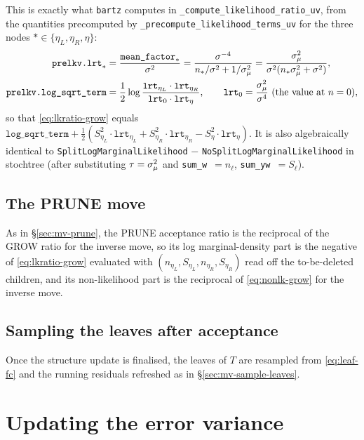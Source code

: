 This is exactly what \texttt{bartz} computes in
\texttt{\_compute\_likelihood\_ratio\_uv}, from the quantities precomputed by
\texttt{\_precompute\_likelihood\_terms\_uv} for the three nodes
$* \in \{\eta_L, \eta_R, \eta\}$:
\begin{align*}
	\texttt{prelkv.lrt}_*       & = \frac{\texttt{mean\_factor}_*}{\sigma^{2}}
	= \frac{\sigma^{-4}}{n_*/\sigma^{2} + 1/\sigma_\mu^{2}}
	= \frac{\sigma_\mu^{2}}{\sigma^{2} (n_* \sigma_\mu^{2} + \sigma^{2})},                                    \\
	\texttt{prelkv.log\_sqrt\_term} & = \frac{1}{2} \log\frac{\texttt{lrt}_{\eta_L} \cdot \texttt{lrt}_{\eta_R}}{\texttt{lrt}_0 \cdot \texttt{lrt}_\eta},
	\qquad \texttt{lrt}_0 = \frac{\sigma_\mu^{2}}{\sigma^4} \text{ (the value at $n = 0$)},
\end{align*}
so that \eqref{eq:lkratio-grow} equals
$\texttt{log\_sqrt\_term} + \frac{1}{2}\left(
	S_{\eta_L}^2 \cdot \texttt{lrt}_{\eta_L}
	+ S_{\eta_R}^2 \cdot \texttt{lrt}_{\eta_R}
	- S_\eta^2 \cdot \texttt{lrt}_\eta\right)$.
It is also algebraically identical to
\texttt{SplitLogMarginalLikelihood} $-$ \texttt{NoSplitLogMarginalLikelihood}
in stochtree (after substituting $\tau = \sigma_\mu^{2}$ and \texttt{sum\_w}~$= n_\ell$,
\texttt{sum\_yw}~$= S_\ell$).

\subsection{The PRUNE move}
\label{sec:prune}

As in \S\ref{sec:mv-prune}, the PRUNE acceptance ratio is the reciprocal of
the GROW ratio for the inverse move, so its log marginal-density part is the
negative of \eqref{eq:lkratio-grow} evaluated with
$(n_{\eta_L}, S_{\eta_L}, n_{\eta_R}, S_{\eta_R})$ read off the
to-be-deleted children, and its non-likelihood part is the reciprocal of
\eqref{eq:nonlk-grow} for the inverse move.

\subsection{Sampling the leaves after acceptance}

Once the structure update is finalised, the leaves of $T$ are resampled from
\eqref{eq:leaf-fc} and the running residuals refreshed as in
\S\ref{sec:mv-sample-leaves}.

\section{Updating the error variance}
\label{sec:sigma-update}

